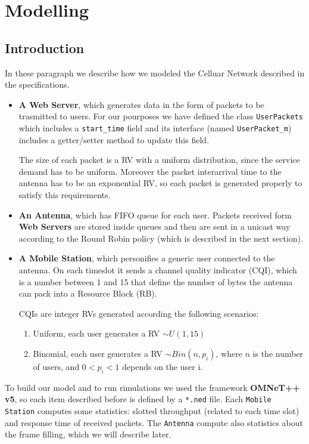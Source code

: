 \chapter{Modelling}
\section{Introduction}
In these paragraph we describe how we modeled the Celluar Network described in the specifications.
\begin{itemize}
   \item \textbf{A Web Server}, which generates data in the form of packets to be trasmitted to users. For our pourposes we have defined the class \texttt{UserPackets} which includes a \texttt{start\_time} field and its interface (named \texttt{UserPacket\_m}) includes a getter/setter method to update this field.
   
   The size of each packet is a RV with a uniform distribution, since the service demand has to be uniform. Moreover the packet interarrival time to the antenna has to be an exponential RV, so each packet is generated properly to satisfy this requirements.

   \item \textbf{An Antenna}, which has FIFO queue for each user. Packets received form \textbf{Web Servers} are stored inside queues and then are sent in a unicast way according to the Round Robin policy (which is described in the next section). 
   
   \item \textbf{A Mobile Station}, which personifies a generic user connected to the antenna. On each timeslot it sends a channel quality indicator (CQI), which is a number between 1 and 15 that define the number of bytes the antenna can pack into a Resource Block (RB).
   
   CQIs are integer RVs generated according the following scenarios:
   
   \begin{enumerate} 
    \item Uniform, each user generates a RV \(\sim U(1,15)\)
    \item Binomial, each user generates a RV \(\sim Bin(n,p_i)\), where \(n\) is the number of users, and \( 0<p_i<1\) depends on the user i.
    \end{enumerate} 
\end{itemize}
To build our model and to run rimulations we used the framework \textbf{OMNeT++ v5}, so each item described before is defined by a \texttt{*.ned} file.
Each \texttt{Mobile Station} computes some statistics: slotted throughput (related to each time slot) and response time of received packets. The \texttt{Antenna} compute also statistics about the frame filling, which we will describe later.

